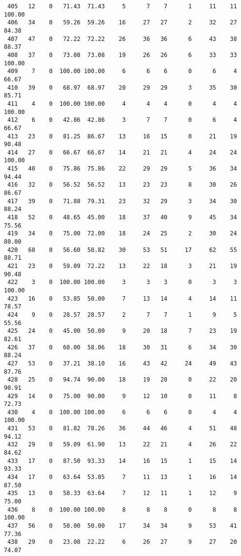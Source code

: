\begin{verbatim}
 405   12    0   71.43  71.43     5      7    7      1     11    11   100.00
 406   34    0   59.26  59.26    16     27   27      2     32    27    84.38
 407   47    0   72.22  72.22    26     36   36      6     43    38    88.37
 408   37    0   73.08  73.08    19     26   26      6     33    33   100.00
 409    7    0  100.00 100.00     6      6    6      0      6     4    66.67
 410   39    0   68.97  68.97    20     29   29      3     35    30    85.71
 411    4    0  100.00 100.00     4      4    4      0      4     4   100.00
 412    6    0   42.86  42.86     3      7    7      0      6     4    66.67
 413   23    0   81.25  86.67    13     16   15      0     21    19    90.48
 414   27    0   66.67  66.67    14     21   21      4     24    24   100.00
 415   40    0   75.86  75.86    22     29   29      5     36    34    94.44
 416   32    0   56.52  56.52    13     23   23      8     30    26    86.67
 417   39    0   71.88  79.31    23     32   29      3     34    30    88.24
 418   52    0   48.65  45.00    18     37   40      9     45    34    75.56
 419   34    0   75.00  72.00    18     24   25      2     30    24    80.00
 420   68    0   56.60  58.82    30     53   51     17     62    55    88.71
 421   23    0   59.09  72.22    13     22   18      3     21    19    90.48
 422    3    0  100.00 100.00     3      3    3      0      3     3   100.00
 423   16    0   53.85  50.00     7     13   14      4     14    11    78.57
 424    9    0   28.57  28.57     2      7    7      1      9     5    55.56
 425   24    0   45.00  50.00     9     20   18      7     23    19    82.61
 426   37    0   60.00  58.06    18     30   31      6     34    30    88.24
 427   53    0   37.21  38.10    16     43   42     24     49    43    87.76
 428   25    0   94.74  90.00    18     19   20      0     22    20    90.91
 429   14    0   75.00  90.00     9     12   10      0     11     8    72.73
 430    4    0  100.00 100.00     6      6    6      0      4     4   100.00
 431   53    0   81.82  78.26    36     44   46      4     51    48    94.12
 432   29    0   59.09  61.90    13     22   21      4     26    22    84.62
 433   17    0   87.50  93.33    14     16   15      1     15    14    93.33
 434   17    0   63.64  53.85     7     11   13      1     16    14    87.50
 435   13    0   58.33  63.64     7     12   11      1     12     9    75.00
 436    8    0  100.00 100.00     8      8    8      0      8     8   100.00
 437   56    0   50.00  50.00    17     34   34      9     53    41    77.36
 438   29    0   23.08  22.22     6     26   27      9     27    20    74.07

\end{verbatim}
